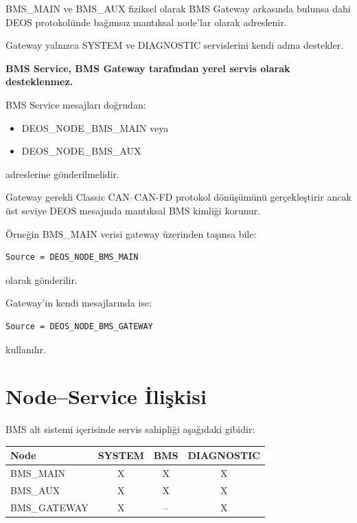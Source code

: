 \documentclass[a4paper,10pt]{article}
\begin{document}
BMS\_MAIN ve BMS\_AUX fiziksel olarak BMS Gateway arkasında
bulunsa dahi DEOS protokolünde bağımsız mantıksal node'lar olarak
adreslenir.

Gateway yalnızca SYSTEM ve DIAGNOSTIC servislerini kendi adına
destekler.

\textbf{BMS Service, BMS Gateway tarafından yerel servis olarak
desteklenmez.}

BMS Service mesajları doğrudan:

\begin{itemize}
    \item DEOS\_NODE\_BMS\_MAIN veya
    \item DEOS\_NODE\_BMS\_AUX
\end{itemize}

adreslerine gönderilmelidir.

Gateway gerekli Classic CAN--CAN-FD protokol dönüşümünü gerçekleştirir
ancak üst seviye DEOS mesajında mantıksal BMS kimliği korunur.

Örneğin BMS\_MAIN verisi gateway üzerinden taşınsa bile:

\begin{lstlisting}
Source = DEOS_NODE_BMS_MAIN
\end{lstlisting}

olarak gönderilir.

Gateway'in kendi mesajlarında ise:

\begin{lstlisting}
Source = DEOS_NODE_BMS_GATEWAY
\end{lstlisting}

kullanılır.

\section{Node--Service İlişkisi}

BMS alt sistemi içerisinde servis sahipliği aşağıdaki gibidir:

\begin{center}
\begin{tabular}{l c c c}
\toprule
\textbf{Node} &
\textbf{SYSTEM} &
\textbf{BMS} &
\textbf{DIAGNOSTIC} \\
\midrule

BMS\_MAIN    & X & X & X \\
BMS\_AUX     & X & X & X \\
BMS\_GATEWAY & X & -- & X \\

\bottomrule
\end{tabular}
\end{center}
\end{document}
